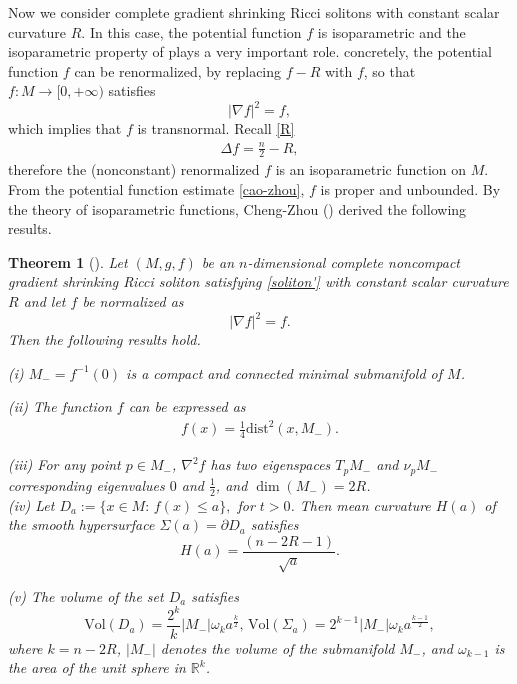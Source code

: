 \documentclass[12pt]{amsart}
\newcommand{\ban}{\begin{eqnarray*}}
\newcommand{\ean}{\end{eqnarray*}}
\newtheorem{theo}{Theorem}[section]
\begin{document}
	
	Now we consider complete gradient shrinking Ricci solitons with constant scalar curvature $R$. In this case, the potential function $f$ is isoparametric and the isoparametric property of plays a very important role.
	concretely, the potential function $f$ can be renormalized, by replacing $f-R$  with $f$, so that $f:M\to [0, +\infty)$ satisfies 	 \begin{equation}\label{iso1}
	|\nabla f|^2=f,
	\end{equation}
	which implies that $f$ is transnormal.
	Recall \eqref{R}
	\begin{align*}\label{R'}
	\Delta f=\frac{n}2-R,
	\end{align*}
	therefore the (nonconstant) renormalized $f$ is an isoparametric function on $M$. From the potential function estimate \eqref{cao-zhou},  $f$ is proper and unbounded.
	By the theory of isoparametric functions, Cheng-Zhou (\cite{Cheng-Zhou})
	derived the following results.
	\begin{theo}[\cite{Cheng-Zhou}]\label{levelset}
		Let $(M, g, f)$
		be an $n$-dimensional complete noncompact gradient shrinking Ricci soliton satisfying \eqref{soliton'} with constant scalar curvature $R$ and let $f$ be normalized as
		\[
		|\nabla f|^2=f.
		\]
		Then the following results hold.
		
		\smallskip	
		{\rm (i)} $M_{-}=f^{-1}(0)$ is a compact and  connected minimal submanifold of $M$.
		
		\smallskip	
		{\rm (ii)} The function $f$ can be expressed as
		\ban
		f(x)=\frac{1}{4} \text{dist}^2 (x, M_{-}).
		\ean
		
		\smallskip	
		{\rm (iii)} For any point $p\in M_{-}$, $\nabla^2f$ has two eigenspaces $T_pM_{-}$ and $\nu_pM_{-}$ corresponding eigenvalues $0$ and $\frac12$, and $\dim(M_{-})=2R$.\\
		
		\smallskip	
		{\rm (iv)} Let $D_a:=\{x\in M:\,f(x)\leq a\},$ for $t>0$. Then  mean curvature $H(a)$ of the smooth hypersurface $\Sigma(a)=\partial D_a$ satisfies
		\[H(a)=\frac{(n-2R-1)}{\sqrt{a}}.\]
		
		\smallskip	
		{\rm (v)} The volume of the set $D_a$ satisfies
		\[\textrm{Vol} (D_a)= \frac{2^k}{k}|M_{-}|\omega_k a^\frac{k}{2}, \, \textrm{Vol} (\Sigma_a)= 2^{k-1}|M_{-}|\omega_k a^\frac{k-1}{2},\]
		where $k=n-2R$, $|M_{-}|$ denotes the volume of the submanifold $M_{-}$, and  $\omega_{k-1}$ is the area of the unit sphere in $\mathbb{R}^k$.
	\end{theo}
	
\end{document}
